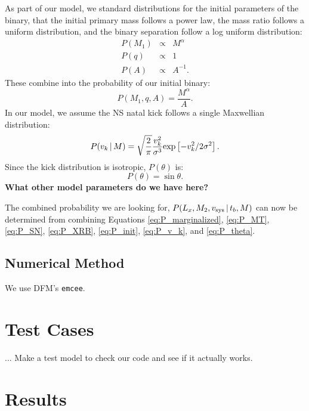 \documentclass[12pt, preprint]{aastex}
\newcommand{\given}{\,|\,}
\begin{document}
As part of our model, we standard distributions for the initial parameters of the binary, that the initial primary mass follows a power law, the mass ratio follows a uniform distribution, and the binary separation follow a log uniform distribution:
\begin{eqnarray}
P(M_1) &\propto& M^{\alpha} \\
P(q) &\propto& 1 \\
P(A) &\propto& A^{-1}.
\end{eqnarray}
These combine into the probability of our initial binary:
\begin{equation}
P(M_1, q, A) = \frac{M^{\alpha}}{A}. \label{eq:P_init}
\end{equation}
In our model, we assume the NS natal kick follows a single Maxwellian distribution:
\begin{equation}
P(v_k \given M) = \sqrt{\frac{2}{\pi}} \frac{v_k^2} {\sigma^3} {\rm exp} \left[ -v_k^2 / 2 \sigma^2 \right]. \label{eq:P_v_k}
\end{equation}
Since the kick distribution is isotropic, $P(\theta)$ is:
\begin{equation}
P(\theta) = \sin \theta. \label{eq:P_theta}
\end{equation}
{\bf What other model parameters do we have here?}

The combined probability we are looking for, $P(L_x, M_2, v_{\rm sys} \given t_b, M)$ can now be determined from combining Equations \ref{eq:P_marginalized}, \ref{eq:P_MT}, \ref{eq:P_SN}, \ref{eq:P_XRB}, \ref{eq:P_init}, \ref{eq:P_v_k}, and \ref{eq:P_theta}.



\subsection{Numerical Method}

We use DFM's {\tt emcee}.



\section{Test Cases}

... Make a test model to check our code and see if it actually works.

\section{Results}
\end{document}
